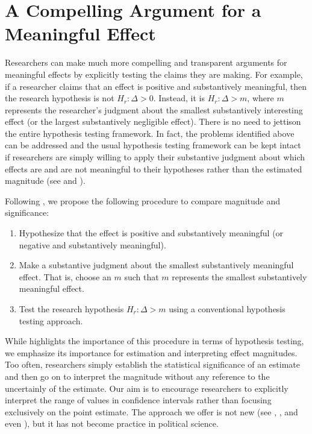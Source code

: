 \documentclass[12pt]{article}
\begin{document}
\section*{A Compelling Argument for a Meaningful Effect}

Researchers can make much more compelling and transparent arguments for meaningful effects by explicitly testing the claims they are making. For example, if  a researcher claims that an effect is positive and substantively meaningful, then the research hypothesis is not $H_r: \Delta > 0$. Instead, it is $H_r: \Delta > m$, where $m$ represents the researcher's judgment about the smallest substantively interesting effect (or the largest substantively negligible effect). There is no need to jettison the entire hypothesis testing framework. In fact, the problems identified above can be addressed and the usual hypothesis testing framework can be kept intact if researchers are simply willing to apply their substantive judgment about which effects are and are not meaningful to their hypotheses rather than the estimated magnitude (see \citealt{Rainey2014} and \citealt{Gross2014}). 

Following \citealt{Gross2014}, we propose the following procedure to compare magnitude and significance:

\begin{enumerate}
\item Hypothesize that the effect is positive and substantively meaningful (or negative and substantively meaningful).
\item Make a substantive judgment about the smallest substantively meaningful effect. That is, choose an $m$ such that $m$ represents the smallest substantively meaningful effect.
\item Test the research hypothesis $H_r: \Delta > m$ using a conventional hypothesis testing approach.
\end{enumerate}

While \cite{Gross2014} highlights the importance of this procedure in terms of hypothesis testing, we emphasize its importance for estimation and interpreting effect magnitudes. Too often, researchers simply establish the statistical significance of an estimate and then go on to interpret the magnitude without any reference to the uncertainly of the estimate. Our aim is to encourage researchers to explicitly interpret the range of values in confidence intervals rather than focusing exclusively on the point estimate. The approach we offer is not new (see \citealt{Rainey2014}, \citealt{Gross2014}, and even \citealt{Achen1982}), but it has not become practice in political science.
\end{document}
